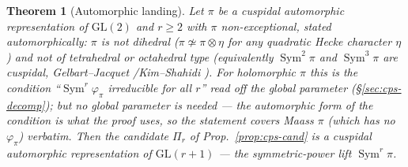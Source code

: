\documentclass[11pt]{article}
\newtheorem{theorem}{Theorem}
\theoremstyle{definition}
\newcommand{\Sym}{\operatorname{Sym}}
\begin{document}
\begin{theorem}[Automorphic landing]\label{thm:func}
Let $\pi$ be a cuspidal automorphic representation of $\mathrm{GL}(2)$ and $r\ge2$ with $\pi$
\emph{non-exceptional}, stated automorphically: $\pi$ is not dihedral ($\pi\not\simeq\pi\otimes\eta$ for any
quadratic Hecke character $\eta$) and not of tetrahedral or octahedral type (equivalently $\Sym^2\pi$ and
$\Sym^3\pi$ are cuspidal, Gelbart--Jacquet \cite{GJ}/Kim--Shahidi \cite{KimShahidi}). For holomorphic $\pi$ this
is the condition ``$\Sym^r\varphi_\pi$ irreducible for all $r$'' read off the global parameter
(\S\ref{sec:cps-decomp}); but no global parameter is needed --- the automorphic form of the condition is what the
proof uses, so the statement covers Maass $\pi$ (which has no $\varphi_\pi$) verbatim. Then the candidate $\Pi_r$
of Prop.~\ref{prop:cps-cand} is a \emph{cuspidal automorphic} representation of $\mathrm{GL}(r+1)$ --- the
symmetric-power lift $\Sym^r\pi$.
\end{theorem}
\end{document}
